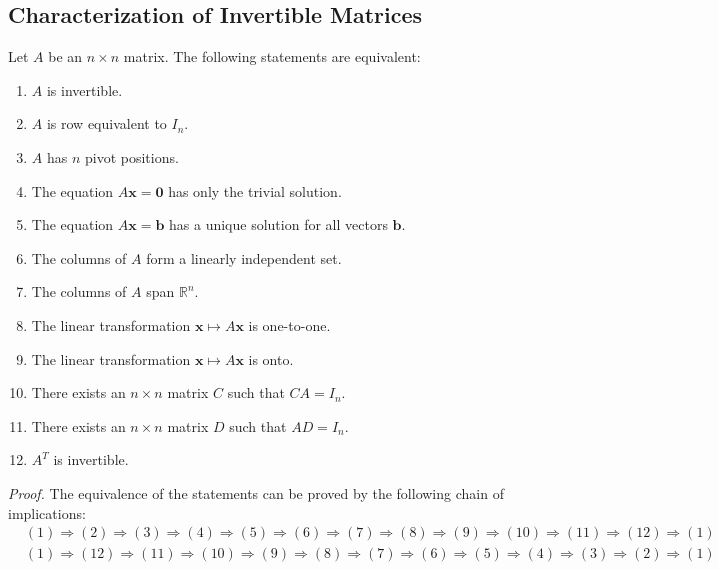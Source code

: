 \documentclass[10pt, a4paper]{article}
\begin{document}
\subsection{Characterization of Invertible Matrices}
\begin{proposition}
    Let $A$ be an $n\times n$ matrix. The following statements are equivalent:
    \begin{enumerate}
        \item $A$ is invertible.
        \item $A$ is row equivalent to $I_n$.
        \item $A$ has $n$ pivot positions.
        \item The equation $A\mathbf{x} = \mathbf{0}$ has only the trivial solution.
        \item The equation $A\mathbf{x} = \mathbf{b}$ has a unique solution for all vectors $\mathbf{b}$.
        \item The columns of $A$ form a linearly independent set.
        \item The columns of $A$ span $\mathbb{R}^n$.
        \item The linear transformation $\mathbf{x} \mapsto A\mathbf{x}$ is one-to-one.
        \item The linear transformation $\mathbf{x} \mapsto A\mathbf{x}$ is onto.
        \item There exists an $n\times n$ matrix $C$ such that $CA = I_n$.
        \item There exists an $n\times n$ matrix $D$ such that $AD = I_n$.
        \item $A^T$ is invertible.
    \end{enumerate}
\end{proposition}
\textit{Proof.} The equivalence of the statements can be proved by the following chain of implications:
\begin{align*}
    & (1) \Rightarrow (2) \Rightarrow (3) \Rightarrow (4) \Rightarrow (5) \Rightarrow (6) \Rightarrow (7) \Rightarrow (8) \Rightarrow (9) \Rightarrow (10) \Rightarrow (11) \Rightarrow (12) \Rightarrow (1) \\
    & (1) \Rightarrow (12) \Rightarrow (11) \Rightarrow (10) \Rightarrow (9) \Rightarrow (8) \Rightarrow (7) \Rightarrow (6) \Rightarrow (5) \Rightarrow (4) \Rightarrow (3) \Rightarrow (2) \Rightarrow (1)
\end{align*}
\end{document}
